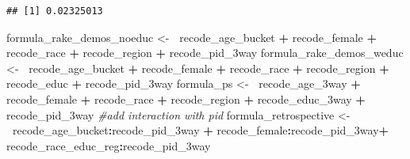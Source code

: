 \documentclass[
]{article}
\newenvironment{Shaded}{\begin{snugshade}}{\end{snugshade}}
\newcommand{\CommentTok}[1]{\textcolor[rgb]{0.56,0.35,0.01}{\textit{#1}}}
\newcommand{\ErrorTok}[1]{\textcolor[rgb]{0.64,0.00,0.00}{\textbf{#1}}}
\newcommand{\NormalTok}[1]{#1}
\newcommand{\OperatorTok}[1]{\textcolor[rgb]{0.81,0.36,0.00}{\textbf{#1}}}
\newcommand{\StringTok}[1]{\textcolor[rgb]{0.31,0.60,0.02}{#1}}
\begin{document}
\begin{verbatim}
## [1] 0.02325013
\end{verbatim}

\begin{Shaded}
\begin{Highlighting}[]
\NormalTok{formula_rake_demos_noeduc <-}\StringTok{ }\ErrorTok{~}\NormalTok{recode_age_bucket }\OperatorTok{+}\StringTok{ }\NormalTok{recode_female }\OperatorTok{+}\StringTok{ }\NormalTok{recode_race }\OperatorTok{+}\StringTok{ }\NormalTok{recode_region }\OperatorTok{+}\StringTok{ }\NormalTok{recode_pid_3way}
\NormalTok{formula_rake_demos_weduc <-}\StringTok{ }\ErrorTok{~}\NormalTok{recode_age_bucket }\OperatorTok{+}\StringTok{ }\NormalTok{recode_female }\OperatorTok{+}\StringTok{ }\NormalTok{recode_race }\OperatorTok{+}\StringTok{ }\NormalTok{recode_region }\OperatorTok{+}\StringTok{ }
\StringTok{    }\NormalTok{recode_educ }\OperatorTok{+}\StringTok{ }\NormalTok{recode_pid_3way}
\NormalTok{formula_ps <-}\StringTok{ }\ErrorTok{~}\NormalTok{recode_age_3way }\OperatorTok{+}\StringTok{ }\NormalTok{recode_female }\OperatorTok{+}\StringTok{ }\NormalTok{recode_race }\OperatorTok{+}
\StringTok{    }\NormalTok{recode_region }\OperatorTok{+}\StringTok{ }\NormalTok{recode_educ_3way }\OperatorTok{+}\StringTok{ }\NormalTok{recode_pid_3way}
\CommentTok{#add interaction with pid}
\NormalTok{formula_retrospective <-}\StringTok{ }\ErrorTok{~}\NormalTok{recode_age_bucket}\OperatorTok{:}\NormalTok{recode_pid_3way }\OperatorTok{+}\StringTok{ }\NormalTok{recode_female}\OperatorTok{:}\NormalTok{recode_pid_3way}\OperatorTok{+}
\StringTok{    }\NormalTok{recode_race_educ_reg}\OperatorTok{:}\NormalTok{recode_pid_3way}
\end{Highlighting}
\end{Shaded}
\end{document}
